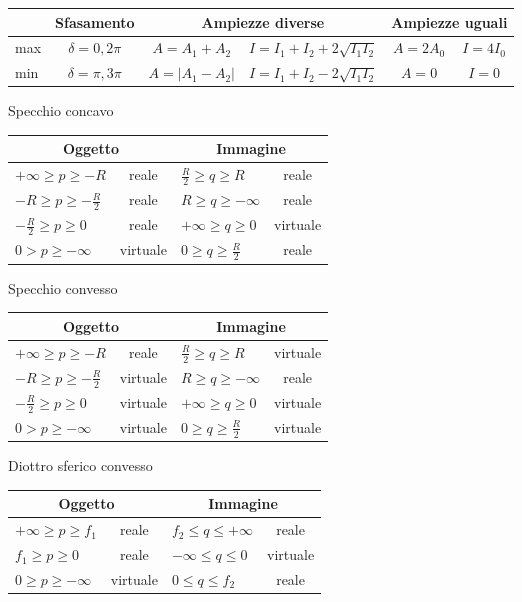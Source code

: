 \documentclass[10pt, twocolumn, a4paper, fleqn]{article}
\def\[{\left[}
\begin{document}
\begin{center}\begin{tabularx}{\textwidth}{l| c cc cc}
\toprule
		& Sfasamento 		& \multicolumn{2}{c}{Ampiezze diverse} 			& \multicolumn{2}{c}{Ampiezze uguali} \\
\midrule
max 		& $\delta=0,2\pi$ 	& $A=A_1+A_2$ 	& $I=I_1+I_2+2\sqrt{I_1I_2}$ 	& $A=2A_0$ 	& $I=4I_0$ \\
min 		& $\delta=\pi,3\pi$ 	& $A=|A_1-A_2|$ 	& $I=I_1+I_2-2\sqrt{I_1I_2}$ 	& $A=0$ 		& $I=0$ \\
\bottomrule
\end{tabularx}\end{center}

\clearpage

Specchio concavo
\begin{center}
\begin{tabularx}{\textwidth}{Xc| Xc}
\toprule
\multicolumn{2}{c}{Oggetto} 			& \multicolumn{2}{c}{Immagine} 	\\
\midrule
$+\infty\ge p\ge-R$ 		& reale 		& $\frac{R}{2}\ge q\ge R$ 		& reale\\[2ex]
$-R\ge p\ge -\frac{R}{2}$ 	& reale 		& $R\ge q\ge -\infty$ 			& reale\\[2ex]
$-\frac{R}{2}\ge p\ge 0$ 	& reale 		& $+\infty\ge q \ge 0$ 			& virtuale\\[2ex]
$0> p\ge -\infty$ 		& virtuale 		& $0\ge q\ge \frac{R}{2}$ 		& reale\\[2ex]
\bottomrule
\end{tabularx}
\end{center}
Specchio convesso
\begin{center}
\begin{tabularx}{\textwidth}{Xc| Xc}
\toprule
\multicolumn{2}{c}{Oggetto} 			& \multicolumn{2}{c}{Immagine} 	\\
\midrule
$+\infty\ge p\ge-R$ 		& reale 		& $\frac{R}{2}\ge q\ge R$ 		& virtuale\\[2ex]
$-R\ge p\ge -\frac{R}{2}$ 	& virtuale 		& $R\ge q\ge -\infty$ 			& reale\\[2ex]
$-\frac{R}{2}\ge p\ge 0$ 	& virtuale 		& $+\infty\ge q \ge 0$ 			& virtuale\\[2ex]
$0> p\ge -\infty$ 		& virtuale 		& $0\ge q\ge \frac{R}{2}$ 		& virtuale\\[2ex]
\bottomrule
\end{tabularx}
\end{center}
Diottro sferico convesso
\begin{center}
\begin{tabularx}{\textwidth}{Xc| Xc}
\toprule
\multicolumn{2}{c}{Oggetto} 			& \multicolumn{2}{c}{Immagine} 	\\
\midrule
$+\infty\ge p\ge f_1$ 		& reale 		& $f_2\le q\le +\infty$ 			& reale\\[2ex]
$f_1\ge p\ge 0$ 			& reale 		& $-\infty\le q\le 0$ 			& virtuale\\[2ex]
$0\ge p\ge -\infty$ 		& virtuale 		& $0\le q \le f_2$ 			& reale\\[2ex]
\bottomrule
\end{tabularx}
\end{center}
\end{document}
